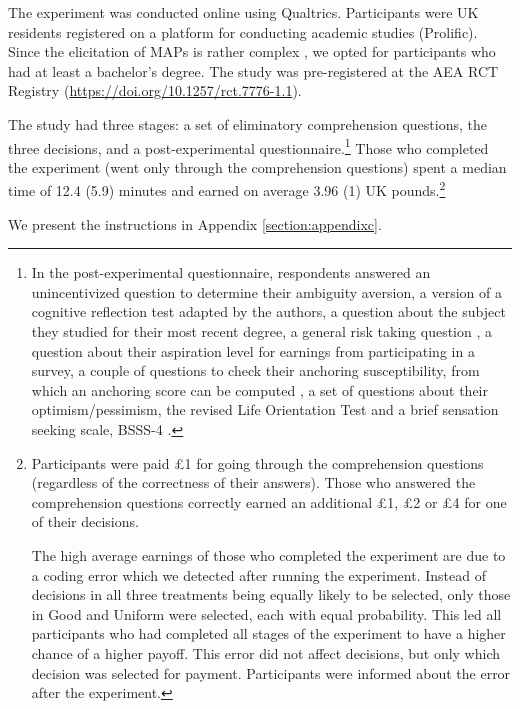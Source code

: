 \documentclass[pdftex,12pt, a4paper]{article}
\begin{document}
The experiment was conducted online using Qualtrics.
Participants were UK residents registered on a platform for conducting academic studies (Prolific).
Since the elicitation of MAPs is rather complex \cite[][Polipciuc, 2022]{Quercia2016}, we opted for participants who had at least a bachelor's degree.
The study was pre-registered at the AEA RCT Registry (\url{https://doi.org/10.1257/rct.7776-1.1}).

The study had three stages: a set of eliminatory comprehension questions, the three decisions, and a post-experimental questionnaire.\footnote{
In the post-experimental questionnaire, respondents answered an unincentivized question to determine their ambiguity aversion, a version of a cognitive reflection test \citep{Frederick2005,Thomson2016} adapted by the authors, a question about the subject they studied for their most recent degree, a general risk taking question \citep{Dohmen2011}, a question about their aspiration level for earnings from participating in a survey, a couple of questions to check their anchoring susceptibility, from which an anchoring score can be computed \citep{Cheek2017}, a set of questions about their optimism/pessimism, the revised Life Orientation Test \citep{Scheier1994} and a brief sensation seeking scale, BSSS-4 \citep{Stephenson2003}.
}
Those who completed the experiment (went only through the comprehension questions) spent a median time of 12.4 (5.9) minutes and earned on average 3.96 (1) UK pounds.\footnote{
Participants were paid \pounds1 for going through the comprehension questions (regardless of the correctness of their answers).
Those who answered the comprehension questions correctly earned an additional \pounds1, \pounds2 or \pounds4 for one of their decisions.

The high average earnings of those who completed the experiment are due to a coding error which we detected after running the experiment.
Instead of decisions in all three treatments being equally likely to be selected, only those in Good and Uniform were selected, each with equal probability.
This led all participants who had completed all stages of the experiment to have a higher chance of a higher payoff.
This error did not affect decisions, but only which decision was selected for payment.
Participants were informed about the error after the experiment.
}

We present the instructions in Appendix \ref{section:appendixc}.
\end{document}
